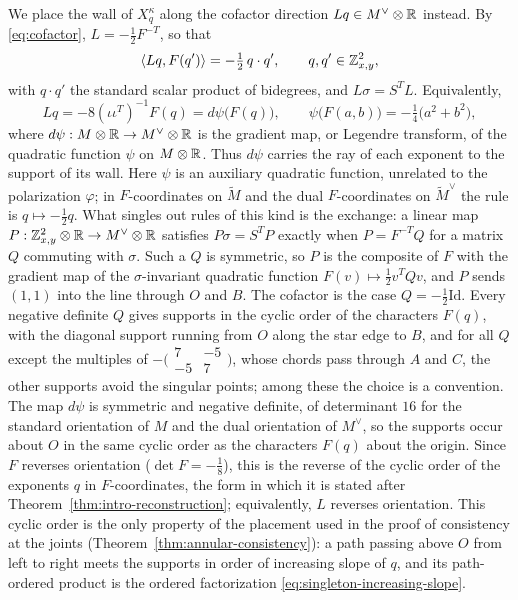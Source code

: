 We place the wall of $X^\kappa_q$ along the cofactor direction
$Lq\in M^\vee\otimes\mathbb R$ instead.  By \eqref{eq:cofactor},
$L=-\frac12F^{-T}$, so that
\begin{equation}\label{eq:cofactor-pairing}
 \langle Lq,F(q')\rangle=-\tfrac12\,q\cdot q',
 \qquad q,q'\in\mathbb Z^2_{x,y},
\end{equation}
with $q\cdot q'$ the standard scalar product of bidegrees, and $L\sigma=S^TL$.
Equivalently,
\[
 Lq=-8(\iota\iota^T)^{-1}F(q)=d\psi\bigl(F(q)\bigr),
 \qquad
 \psi\bigl(F(a,b)\bigr)=-\tfrac14\bigl(a^2+b^2\bigr),
\]
where $d\psi:M\otimes\mathbb R\to M^\vee\otimes\mathbb R$ is the gradient map, or
Legendre transform, of the quadratic function $\psi$ on $M\otimes\mathbb R$.  Thus
$d\psi$ carries the ray of each exponent to the support of its wall.  Here
$\psi$ is an auxiliary quadratic function, unrelated to the polarization
$\varphi$; in $F$-coordinates on $\widetilde M$ and the dual $F$-coordinates
on $\widetilde M^\vee$ the rule is $q\mapsto-\frac12q$.  What singles out
rules of this kind is the exchange: a linear map
$P:\mathbb Z^2_{x,y}\otimes\mathbb R\to M^\vee\otimes\mathbb R$ satisfies $P\sigma=S^TP$
exactly when $P=F^{-T}Q$ for a matrix $Q$ commuting with $\sigma$.  Such a $Q$
is symmetric, so $P$ is the composite of $F$ with the gradient map of the
$\sigma$-invariant quadratic function $F(v)\mapsto\frac12v^TQv$, and $P$
sends $(1,1)$ into the line through $O$ and $B$.  The cofactor is the case
$Q=-\frac12\mathrm{Id}$.  Every negative definite $Q$ gives supports in the
cyclic order of the characters $F(q)$, with the diagonal support running from $O$
along the star edge to $B$, and for all $Q$ except the multiples of
$-\bigl(\begin{smallmatrix}7&-5\\-5&7\end{smallmatrix}\bigr)$, whose chords pass
through $A$ and $C$, the other supports avoid the singular points; among these the
choice is a convention.  The map $d\psi$ is symmetric and negative definite,
of determinant $16$ for the standard orientation of $M$ and the dual
orientation of $M^\vee$, so the supports occur about $O$ in the same cyclic
order as the characters $F(q)$ about the origin.  Since $F$ reverses
orientation ($\det F=-\frac18$), this is the reverse of the cyclic order of
the exponents $q$ in $F$-coordinates, the form in which it is stated after
Theorem~\ref{thm:intro-reconstruction}; equivalently, $L$
reverses orientation.  This cyclic order is the only property of the
placement used in the proof of consistency at the joints
(Theorem~\ref{thm:annular-consistency}): a path passing above $O$ from left
to right meets the supports in order of increasing slope of $q$, and its
path-ordered product is the ordered factorization
\eqref{eq:singleton-increasing-slope}.

